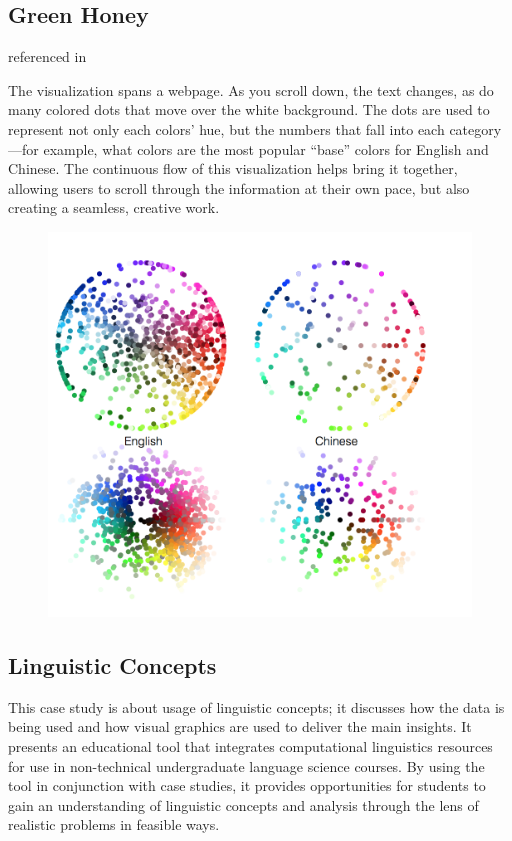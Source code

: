 \documentclass[]{book}
\theoremstyle{definition}
\theoremstyle{definition}
\theoremstyle{definition}
\theoremstyle{remark}
\begin{document}
\subsection{Green Honey}\label{green-honey}

\citep{green_honey} referenced in \citep{cool_data}

The visualization spans a webpage. As you scroll down, the text changes,
as do many colored dots that move over the white background. The dots
are used to represent not only each colors' hue, but the numbers that
fall into each category---for example, what colors are the most popular
``base'' colors for English and Chinese. The continuous flow of this
visualization helps bring it together, allowing users to scroll through
the information at their own pace, but also creating a seamless,
creative work.

\begin{figure}
\centering
\includegraphics{images/colorwords.png}
\caption{}
\end{figure}

\subsection{Linguistic Concepts}\label{linguistic-concepts}

\citep{lingui_data} This case study is about usage of linguistic
concepts; it discusses how the data is being used and how visual
graphics are used to deliver the main insights. It presents an
educational tool that integrates computational linguistics resources for
use in non-technical undergraduate language science courses. By using
the tool in conjunction with case studies, it provides opportunities for
students to gain an understanding of linguistic concepts and analysis
through the lens of realistic problems in feasible ways.
\end{document}
